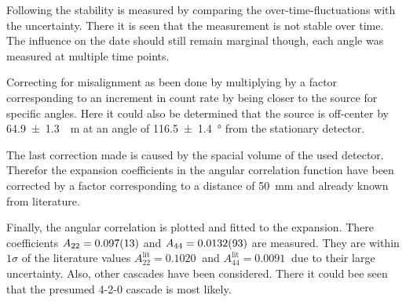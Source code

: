 \documentclass[sn-mathphys-num,icol]{sn-jnl}
\theoremstyle{thmstyleone}
\theoremstyle{thmstyletwo}
\theoremstyle{thmstylethree}
\begin{document}
Following the stability is measured by comparing the over-time-fluctuations with the uncertainty. There it is seen that the measurement is not stable over time. The influence on the date should still remain marginal though, each angle was measured at multiple time points.

Correcting for misalignment as been done by multiplying by a factor corresponding to an increment in count rate by being closer to the source for specific angles. Here it could also be determined that the source is off-center by \SI{64.9+-1.3}{\mu m} at an angle of \SI{116.5+-1.4}{\degree} from the stationary detector.

The last correction made is caused by the spacial volume of the used detector. Therefor the expansion coefficients in the angular correlation function have been corrected by a factor corresponding to a distance of \SI{50}{mm} and already known from literature\cite{siegbahn}.

Finally, the angular correlation is plotted and fitted to the expansion. There coefficients $A_{22}=\SI{0.097+-0.013}{}$ and $A_{44}=\SI{0.0132+-0.0093}{}$ are measured. They are within $1\sigma$ of the literature values $A_{22}^\text{lit}=\SI{0.1020}{}$ and $A_{44}^\text{lit}=\SI{0.0091}{}$ due to their large uncertainty. Also, other cascades have been considered. There it could bee seen that the presumed 4-2-0 cascade is most likely.






\end{document}

